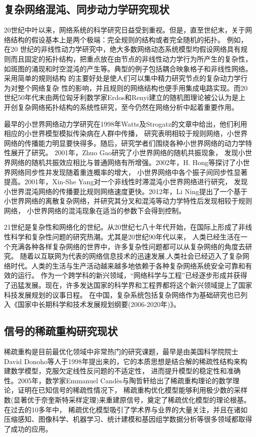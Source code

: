 \subsection{复杂网络混沌、同步动力学研究现状}
20世纪中叶以来，网络系统的科学研究日益受到重视。但是，直至世纪末，关于网络结构的假设基本上是两个极端：完全规则的结构或者完全随机的拓扑。
例如，在20 世纪的非线性动力学研究中，绝大多数网络动态系统模型均假设网络具有规则而且固定的拓扑结构，把重点放在由节点的非线性动力学行为所产生的复杂性，
如斑图的涌现和时空混沌的产生等。典型的例子包括耦合映象格子和非线性网络。采用简单的規则结构 的主要好处是使人们可以集中精力研究节点的复杂动力学行为对整个网络复杂
性的影响，并且规则的网络结构也便手用集成电路实现。而20世纪50年代末由两位匈牙利数学家Erdos和Renyi建立的随机图理论被公认为是上开创复杂网络拓扑结构的系统性研究，至今仍然在网络分析中起着重要作用。\par
最早的小世界网络动力学研究在1998年Watts及Strogatz的文章中给出，他们利用相应的小世界模型模拟传染病在人群中传播，
研究表明相较于规则网络，小世界网络的传播能力明显要快得多。随后，研究学者们围绕各种小世界网络的动力学特性展开了研究。
2001年，Zhuo Gao研究了小世界网络的随机共振现象，
发现小世界网络的随机共振效应相比与普通网络有所增强。2002年，H. Hong等探讨了小世界网络同步性并发现随着重连概率的增大，
小世界网络中各个振子间同步性显著提高。2001年，Xin-She Yang对一个非线性时滞混沌小世界网络进行研究，
发现小世界混沌网络的传播要比规则网络速度更快。2012年，Li Ning提出了一个基于小世界网络的离散复杂网络，并研究其分叉和混沌等动力学特性后发现相较于规则网络，
小世界网络的混沌现象在适当的参数下会得到控制。\par
21世纪是复杂性和网络化的世纪。从20世纪七八十年代开始，在国际上形成了非线性科学和复杂性问题的研究热潮。尤其是20世纪90年代以来，
人类已经生活在一个充满各种各样复杂网络的世界中，许多复杂性问题都可以从复杂网络的角度去研究。
随着以互联网为代表的网络信息技术的迅速发展,人类社会已经迈入了复杂网络时代。人类的生活与生产活动越来越多地依赖于各种复杂网络系统安全可靠和有效的运行。
作为一个跨学科的新兴领域，“网络科学与工程”已经逐步形成并获得了迅猛发展。现在，许多发达国家的科学界和工程界都将这个新兴领域提上了国家科技发展规划的议事日程。
在中国，复杂系统包括复杂网络作为基础研究也已列入《国家中长期科学和技术发展规划纲要(2006-2020年)》。
\subsection{信号的稀疏重构研究现状}
稀疏重构是目前最优化领域中非常热门的研究课题，最早是由美国科学院院士David Donoho等人于1998年提出来的，它的本质思想是结合解的稀疏性结构来构建数学模型，克服欠定线性反问题的不适定性，
进而提升模型的稳定性和准确性。2005年，数学家Emmanuel Candès与陶哲轩给出了稀疏重构理论的数学理论，证明在已知信号的稀疏性情况下，
稀疏重构优化模型能够利用极少数的采样数(显著优于奈奎斯特采样定理)来重建原信号，奠定了稀疏优化模型的理论根基。在过去的10多年中，
稀疏优化模型吸引了学术界与业界的大量关注，并且在诸如压缩感知、图像科学、机器学习、统计建模和基因组学数据分析等很多领域都取得了成功的应用。

